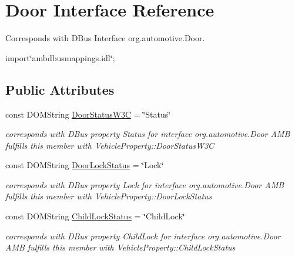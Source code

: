 \hypertarget{interfaceDoor}{\section{Door Interface Reference}
\label{interfaceDoor}
}


Corresponds with D\+Bus Interface org.\+automotive.\+Door.  




{\ttfamily import\char`\"{}ambdbusmappings.\+idl\char`\"{};}

\subsection*{Public Attributes}
\begin{DoxyCompactItemize}
\item 
\hypertarget{interfaceDoor_a4af5af6f4efc20234ce3f257bc5a3347}{const D\+O\+M\+String \hyperlink{interfaceDoor_a4af5af6f4efc20234ce3f257bc5a3347}{Door\+Status\+W3\+C} = \char`\"{}Status\char`\"{}}\label{interfaceDoor_a4af5af6f4efc20234ce3f257bc5a3347}

\begin{DoxyCompactList}\small\item\em corresponds with D\+Bus property Status for interface org.\+automotive.\+Door A\+M\+B fulfills this member with Vehicle\+Property\+::\+Door\+Status\+W3\+C \end{DoxyCompactList}\item 
\hypertarget{interfaceDoor_ae84bb265834617dc8dd0d46c98b7974a}{const D\+O\+M\+String \hyperlink{interfaceDoor_ae84bb265834617dc8dd0d46c98b7974a}{Door\+Lock\+Status} = \char`\"{}Lock\char`\"{}}\label{interfaceDoor_ae84bb265834617dc8dd0d46c98b7974a}

\begin{DoxyCompactList}\small\item\em corresponds with D\+Bus property Lock for interface org.\+automotive.\+Door A\+M\+B fulfills this member with Vehicle\+Property\+::\+Door\+Lock\+Status \end{DoxyCompactList}\item 
\hypertarget{interfaceDoor_aef0d00bd271c3643df33b347ab163b1e}{const D\+O\+M\+String \hyperlink{interfaceDoor_aef0d00bd271c3643df33b347ab163b1e}{Child\+Lock\+Status} = \char`\"{}Child\+Lock\char`\"{}}\label{interfaceDoor_aef0d00bd271c3643df33b347ab163b1e}

\begin{DoxyCompactList}\small\item\em corresponds with D\+Bus property Child\+Lock for interface org.\+automotive.\+Door A\+M\+B fulfills this member with Vehicle\+Property\+::\+Child\+Lock\+Status \end{DoxyCompactList}\end{DoxyCompactItemize}


